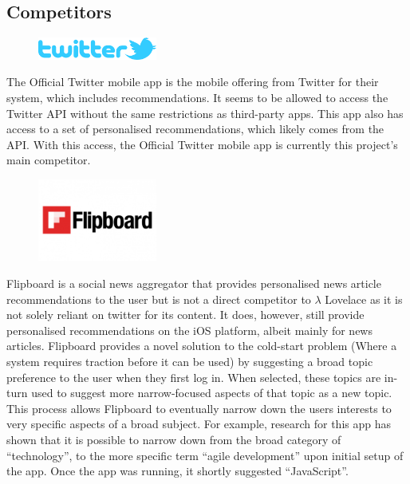 \documentclass{article}
\begin{document}
\newpage


\subsection{Competitors} %

\begin{figure}[H]
    \includegraphics[width=0.35\textwidth]{twitter_logo}
\end{figure}
The Official Twitter mobile app is the mobile offering from Twitter for their system, which includes recommendations. It seems to be allowed to access the Twitter API without the same restrictions as third-party apps. This app also has access to a set of personalised recommendations, which likely comes from the API. With this access, the Official Twitter mobile app is currently this project's main competitor.

\begin{figure}[H]
    \includegraphics[width=0.35\textwidth,trim={0.3cm 2cm 0 1cm},clip]{flipboard_logo}
\end{figure}

\noindent Flipboard is a social news aggregator that provides personalised news article recommendations to the user but is not a direct competitor to $\lambda$ Lovelace as it is not solely reliant on twitter for its content. It does, however, still provide personalised recommendations on the iOS platform, albeit mainly for news articles. Flipboard provides a novel solution to the cold-start problem (Where a system requires traction before it can be used) by suggesting a broad topic preference to the user when they first log in. When selected, these topics  are in-turn used to suggest more narrow-focused aspects of that topic as a new topic. This process allows Flipboard to eventually narrow down the users interests to very specific aspects of a broad subject. For example, research for this app has shown that it is possible to narrow down from the broad category of “technology”, to the more specific term “agile development” upon initial setup of the app. Once the app was running, it shortly suggested “JavaScript”.
\end{document}
